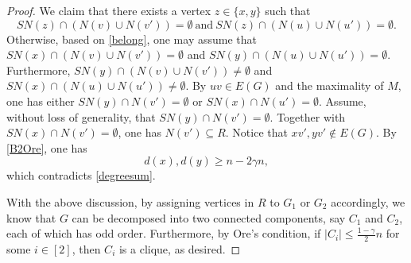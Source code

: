\documentclass[11pt, a4paper]{article}
\theoremstyle{definition}
\newcommand{\<}{\subseteq}
\begin{document}
\begin{proof}
We claim that there exists a vertex $z\in \{x,y\}$ such that 
$$
SN(z)\cap (N(v)\cup N(v'))=\emptyset\ \text{and}\ SN(z)\cap (N(u)\cup N(u'))=\emptyset.
$$ 
Otherwise, based on \eqref{belong}, one may assume that $SN(x)\cap (N(v)\cup N(v'))=\emptyset$ and $SN(y)\cap (N(u)\cup N(u'))=\emptyset$. Furthermore, $SN(y)\cap (N(v)\cup N(v'))\neq \emptyset$ and $SN(x)\cap (N(u)\cup N(u'))\neq \emptyset$. By $uv\in E(G)$ and the maximality of $M$, one has either $SN(y)\cap N(v')=\emptyset$ or $SN(x)\cap N(u')=\emptyset$. 
Assume, without loss of generality, that $SN(y)\cap N(v')=\emptyset$. %
Together with $SN(x)\cap N(v')=\emptyset$, one has $N(v')\subseteq R$. Notice that  $xv',yv'\notin E(G)$. By  \eqref{B2Ore}, one has $$d(x),d(y)\geq n-2\gamma n,$$
which contradicts \eqref{degreesum}. %

With the above discussion, by assigning vertices in $R$ to $G_1$ or $G_2$ accordingly, we know that $G$ can be decomposed into two connected components, say $C_1$ and $C_2$, each of which has odd order.
Furthermore, by Ore's condition, if $|C_i|\leq \frac{1-\gamma}{2}n$ for some $i\in [2]$, then $C_i$ is a clique, as desired.
\end{proof}



\end{document}
